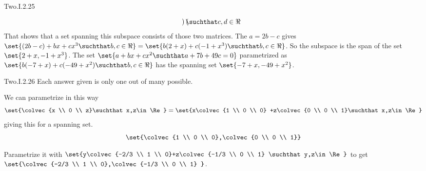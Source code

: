 \begin{ans}{Two.I.2.25}
\begin{exparts}
\begin{equation*}
{\begin{pmatrix}
                      \end{pmatrix}  \suchthat c,d\in\Re}
           \end{equation*}
          That shows that a set spanning this subspace consists of those
          two matrices.
        \partsitem The $a=2b-c$ gives
           \( \set{(2b-c)+bx+cx^3 \suchthat b,c\in\Re}
           =\set{b(2+x)+c(-1+x^3) \suchthat b,c\in\Re}  \).
           So the subspace is the span of the set $\set{2+x, -1+x^3}$.
        \partsitem The set
          \( \set{a+bx+cx^2\suchthat a+7b+49c=0} \)
          parametrized as
          \( \set{b(-7+x)+c(-49+x^2)\suchthat b,c\in\Re} \)
          has the spanning set $\set{-7+x,-49+x^2}$.
      \end{exparts}
    
\end{ans}
\begin{ans}{Two.I.2.26}
      Each answer given is only one out of many possible.
      \begin{exparts}
        \partsitem We can parametrize in this way
          \begin{equation*}
             \set{\colvec{x \\ 0 \\ z}\suchthat x,z\in\Re}
             =\set{x\colvec{1 \\ 0 \\ 0}
                  +z\colvec{0 \\ 0 \\ 1}\suchthat x,z\in\Re}
          \end{equation*}
          giving this for a spanning set.
          \begin{equation*}
             \set{\colvec{1 \\ 0 \\ 0},\colvec{0 \\ 0 \\ 1}}
          \end{equation*}
        \item Parametrize it with
          \( \set{y\colvec{-2/3 \\ 1 \\ 0}+z\colvec{-1/3 \\ 0 \\ 1}
                 \suchthat y,z\in\Re } \)
          to get
          \( \set{\colvec{-2/3 \\ 1 \\ 0},\colvec{-1/3 \\ 0 \\ 1} } \).

\end{exparts}
\end{ans}
